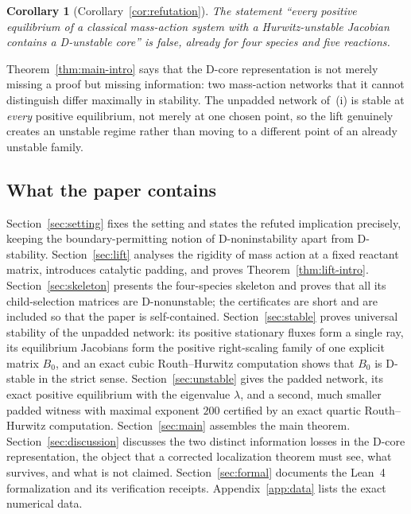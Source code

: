\documentclass[11pt,a4paper]{article}
\theoremstyle{plain}
\newtheorem{corollary}[theorem]{Corollary}
\theoremstyle{definition}
\theoremstyle{remark}
\begin{document}
\begin{corollary}[Corollary~\ref{cor:refutation}]
The statement ``every positive equilibrium of a classical mass-action system with a Hurwitz-unstable Jacobian contains a D-unstable core'' is false, already for four species and five reactions.
\end{corollary}

Theorem~\ref{thm:main-intro} says that the D-core representation is not merely missing a proof but missing information: two mass-action networks that it cannot distinguish differ maximally in stability. The unpadded network of~(i) is stable at \emph{every} positive equilibrium, not merely at one chosen point, so the lift genuinely creates an unstable regime rather than moving to a different point of an already unstable family.

\subsection*{What the paper contains}

Section~\ref{sec:setting} fixes the setting and states the refuted implication precisely, keeping the boundary-permitting notion of D-noninstability apart from D-stability. Section~\ref{sec:lift} analyses the rigidity of mass action at a fixed reactant matrix, introduces catalytic padding, and proves Theorem~\ref{thm:lift-intro}. Section~\ref{sec:skeleton} presents the four-species skeleton and proves that all its child-selection matrices are D-nonunstable; the certificates are short and are included so that the paper is self-contained. Section~\ref{sec:stable} proves universal stability of the unpadded network: its positive stationary fluxes form a single ray, its equilibrium Jacobians form the positive right-scaling family of one explicit matrix $B_0$, and an exact cubic Routh--Hurwitz computation shows that $B_0$ is D-stable in the strict sense. Section~\ref{sec:unstable} gives the padded network, its exact positive equilibrium with the eigenvalue $\lambda$, and a second, much smaller padded witness with maximal exponent $200$ certified by an exact quartic Routh--Hurwitz computation. Section~\ref{sec:main} assembles the main theorem. Section~\ref{sec:discussion} discusses the two distinct information losses in the D-core representation, the object that a corrected localization theorem must see, what survives, and what is not claimed. Section~\ref{sec:formal} documents the Lean~4 formalization and its verification receipts. Appendix~\ref{app:data} lists the exact numerical data.
\end{document}
